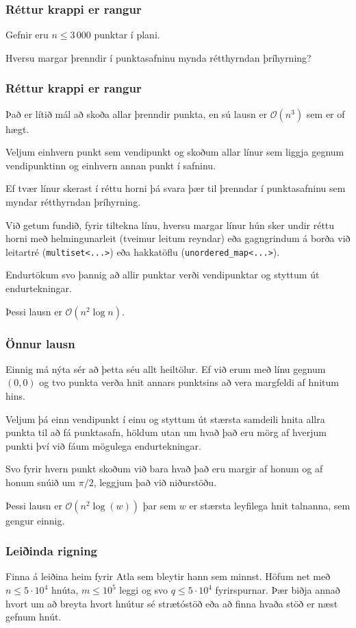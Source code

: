 {
	\frametitle{Réttur krappi er rangur}
	{
		\item<1-> Gefnir eru $n \leq 3\, 000$ punktar í plani.
		\item<2-> Hversu margar þrenndir í punktasafninu mynda rétthyrndan þríhyrning?
	}
}

{
	\frametitle{Réttur krappi er rangur}
	{
		\item<1-> Það er lítið mál að skoða allar þrenndir punkta, en sú lausn er $\mathcal{O}(n^3)$ sem er of hægt.
		\item<2-> Veljum einhvern punkt sem vendipunkt og skoðum allar línur sem liggja gegnum vendipunktinn og einhvern annan punkt í safninu.
		\item<3-> Ef tvær línur skerast í réttu horni þá svara þær til þrenndar í punktasafninu sem myndar rétthyrndan þríhyrning.
		\item<4-> Við getum fundið, fyrir tiltekna línu, hversu margar línur hún sker undir réttu horni með helmingunarleit (tveimur leitum reyndar)
					eða gagngrindum á borða við leitartré (\texttt{multiset<...>}) eða hakkatöflu (\texttt{unordered\_map<...>}).
		\item<5-> Endurtökum svo þannig að allir punktar verði vendipunktar og styttum út endurtekningar.
		\item<6-> Þessi lausn er $\mathcal{O}(n^2 \log n)$.
	}
}

{
    \frametitle{Önnur lausn}
    {
        \item<1-> Einnig má nýta sér að þetta séu allt heiltölur. Ef við erum með línu gegnum $(0, 0)$ og tvo punkta verða hnit annars punktsins
            að vera margfeldi af hnitum hins. 
        \item<2-> Veljum þá einn vendipunkt í einu og styttum út stærsta samdeili hnita allra punkta til að fá punktasafn, höldum utan um hvað
            það eru mörg af hverjum punkti því við fáum mögulega endurtekningar.
        \item<3-> Svo fyrir hvern punkt skoðum við bara hvað það eru margir af honum og af honum snúið um $\pi/2$, leggjum það við niðurstöðu.
        \item<4-> Þessi lausn er $\mathcal{O}(n^2 \log(w))$ þar sem $w$ er stærsta leyfilega hnit talnanna, sem gengur einnig.
    }
}

{
	\frametitle{Leiðinda rigning}
	{
		\item<1-> Finna á leiðina heim fyrir Atla sem bleytir hann sem minnst. Höfum net með $n \leq 5 \cdot 10^4$ hnúta, $m \leq 10^5$ leggi
            og svo $q \leq 5 \cdot 10^4$ fyrirspurnar. Þær biðja annað hvort um að breyta hvort hnútur sé strætóstöð eða að finna hvaða stöð
            er næst gefnum hnút.
	}
}

